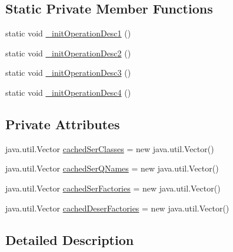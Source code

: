 \subsection*{Static Private Member Functions}
\begin{DoxyCompactItemize}
\item 
static void \hyperlink{classorg_1_1glite_1_1security_1_1voms_1_1service_1_1admin_1_1VOMSAdminSoapBindingStub_a068a020a8fd858c44ebdf9024b219519}{\_\-initOperationDesc1} ()
\item 
static void \hyperlink{classorg_1_1glite_1_1security_1_1voms_1_1service_1_1admin_1_1VOMSAdminSoapBindingStub_a92bb194ae5396552d44735ec0eadbf68}{\_\-initOperationDesc2} ()
\item 
static void \hyperlink{classorg_1_1glite_1_1security_1_1voms_1_1service_1_1admin_1_1VOMSAdminSoapBindingStub_ac0d392484cf0379f77fb617e98a52f2b}{\_\-initOperationDesc3} ()
\item 
static void \hyperlink{classorg_1_1glite_1_1security_1_1voms_1_1service_1_1admin_1_1VOMSAdminSoapBindingStub_a1f2d9e65f3e4c6bde199cb05a7edaa43}{\_\-initOperationDesc4} ()
\end{DoxyCompactItemize}
\subsection*{Private Attributes}
\begin{DoxyCompactItemize}
\item 
java.util.Vector \hyperlink{classorg_1_1glite_1_1security_1_1voms_1_1service_1_1admin_1_1VOMSAdminSoapBindingStub_a8eb8874b8171e8c2e9b81b0072cd41a9}{cachedSerClasses} = new java.util.Vector()
\item 
java.util.Vector \hyperlink{classorg_1_1glite_1_1security_1_1voms_1_1service_1_1admin_1_1VOMSAdminSoapBindingStub_ad7b8645e836d36f413ffb23ca34e3c5d}{cachedSerQNames} = new java.util.Vector()
\item 
java.util.Vector \hyperlink{classorg_1_1glite_1_1security_1_1voms_1_1service_1_1admin_1_1VOMSAdminSoapBindingStub_aa3d0a4136ef487e2af904ef5b7ffafb6}{cachedSerFactories} = new java.util.Vector()
\item 
java.util.Vector \hyperlink{classorg_1_1glite_1_1security_1_1voms_1_1service_1_1admin_1_1VOMSAdminSoapBindingStub_a73e5ca0b5a895386516bb7ec7bee06fe}{cachedDeserFactories} = new java.util.Vector()
\end{DoxyCompactItemize}


\subsection{Detailed Description}


